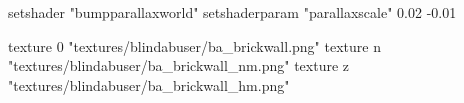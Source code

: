 	setshader "bumpparallaxworld"
	setshaderparam "parallaxscale" 0.02 -0.01

		texture 0 "textures/blindabuser/ba_brickwall.png"
		texture n "textures/blindabuser/ba_brickwall_nm.png"
		texture z "textures/blindabuser/ba_brickwall_hm.png"
